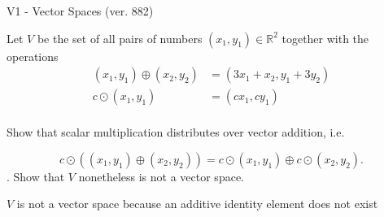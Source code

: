 \begin{exercise}
  \begin{exerciseTitle}V1 - Vector Spaces (ver. 882)\end{exerciseTitle}
  \begin{exerciseStatement}
    Let \(V\) be the set of all pairs of numbers \((x_1,y_1)\in\mathbb{R}^2\)  together with the operations 
\begin{align*}
(x_1,y_1)\oplus (x_2,y_2)&= (3x_1+x_2, y_1+3y_2)\\ 
c \odot (x_1,y_1) &= (cx_1,cy_1)\\ 
\end{align*}

	Show that scalar multiplication distributes over vector addition, i.e. 
					
\[c\odot \left((x_1,y_1)\oplus(x_2,y_2)\right)=c\odot(x_1,y_1)\oplus c\odot(x_2,y_2).\]
.
	Show that \(V\) nonetheless is not a vector space.
	


  \end{exerciseStatement}
  \begin{exerciseAnswer}
   \(V\) is not a vector space because an additive identity element does not exist
	
  


  \end{exerciseAnswer}
\end{exercise}